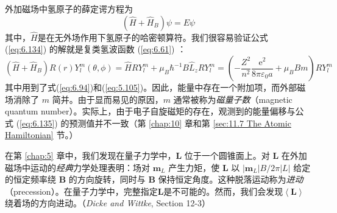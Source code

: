     外加磁场中氢原子的薛定谔方程为
    \begin{equation}
        \left(\hat{H}+\hat{H}_B\right)\psi = E\psi
        \label{eq:6.134}
    \end{equation}
    其中，$\hat{H}$是在无外场作用下氢原子的哈密顿算符。我们很容易验证公式 (\ref{eq:6.134}) 的解就是复类氢波函数 (\ref{eq:6.61}) ：
    \begin{equation}
        \left(\hat{H}+\hat{H}_B\right)R\left(r\right)Y_l^m\left(\theta,\phi\right) = \hat{H}RY_l^m + \mu_B\hbar^{-1}B\hat{L}_zRY_l^m = \left(-\frac{Z^2}{n^2}\frac{\mathrm{e}^2}{8\pi\varepsilon_0a}+\mu_BBm\right)RY_l^m
        \label{eq:6.135}
    \end{equation}
    其中用到了式(\ref{eq:6.94})和(\ref{eq:5.105})。因此，能量中存在一个附加项，而外部磁场消除了 $m$ 简并。由于显而易见的原因，$m$ 通常被称为\textit{磁量子数}（magnetic quantum number）。实际上，由于电子自旋磁矩的存在，观测到的能量偏移与公式 (\ref{eq:6.135}) 的预测值并不一致（第 \ref{chap:10} 章和第 \ref{sec:11.7 The Atomic Hamiltonian} 节。）

    在第 \ref{chap:5} 章中，我们发现在量子力学中，$\mathbf{L}$ 位于一个圆锥面上。对 $\mathbf{L}$ 在外加磁场中运动的\textit{经典}力学处理表明：场对 $\mathbf{m}_L$ 产生力矩，使 $\mathbf{L}$ 以 $\left|\mathbf{m}_L\right|B/2\pi \left|L\right|$ 给定的恒定频率绕 $\mathbf{B}$ 的方向旋转，同时与 $\mathbf{B}$ 保持恒定角度。这种脱落运动称为\textit{进动}（precession）。在量子力学中，完整指定$\mathbf{L}$是不可能的。然而，我们会发现$\left\langle \mathbf{L} \right\rangle$绕着场的方向进动。（\textit{Dicke and Wittke}, Section 12-3）

